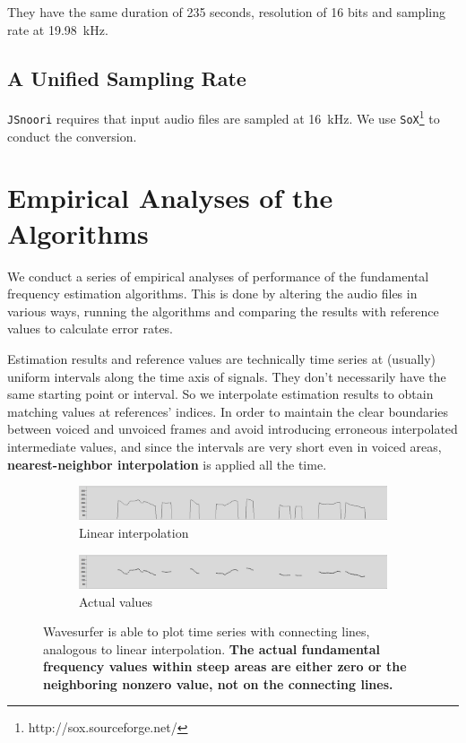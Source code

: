 \documentclass[11pt,a4paper,titlepage]{article}
\begin{document}
They have the same duration of 235 seconds, resolution of 16 bits and sampling rate at \SI{19.98}{\kilo\hertz}.

\subsection{A Unified Sampling Rate}

\texttt{JSnoori} requires that input audio files are sampled at \SI{16}{\kilo\hertz}.
We use \texttt{SoX}\footnote{http://sox.sourceforge.net/} to conduct the conversion.

\newpage

\section{Empirical Analyses of the Algorithms} \label{emp-aly}

We conduct a series of empirical analyses of performance of the fundamental frequency estimation algorithms.
This is done by altering the audio files in various ways, running the algorithms and comparing the results with reference values to calculate error rates.

Estimation results and reference values are technically time series at (usually) uniform intervals along the time axis of signals.
They don't necessarily have the same starting point or interval.
So we interpolate estimation results to obtain matching values at references' indices.
In order to maintain the clear boundaries between voiced and unvoiced frames and avoid introducing erroneous interpolated intermediate values, and since the intervals are very short even in voiced areas, \textbf{nearest-neighbor interpolation} is applied all the time.

\begin{figure}[htbp]
  \centering
  \begin{subfigure}{\textwidth}
    \includegraphics[width=\textwidth]{f0s-lp.png}
    \caption{Linear interpolation}
    \label{fig:f0s-lp}
  \end{subfigure}

  \begin{subfigure}{\textwidth}
    \includegraphics[width=\textwidth]{f0s-real.png}
    \caption{Actual values}
    \label{fig:f0s-real}
  \end{subfigure}

  \caption{Wavesurfer is able to plot time series with connecting lines, analogous to linear interpolation.
    \textbf{The actual fundamental frequency values within steep areas are either zero or the neighboring nonzero value, not on the connecting lines.}}
  \label{fig:f0s}
\end{figure}
\end{document}

